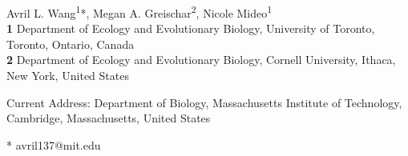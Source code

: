 \documentclass[10pt,letterpaper]{article}
\begin{document}
\vspace*{0.2in}

\begin{flushleft}
{\Large
\textbf{} 
}
\newline

Avril L. Wang\textsuperscript{1\textcurrency}*,
Megan A. Greischar\textsuperscript{2},
Nicole Mideo\textsuperscript{1}
\\
\bigskip
\textbf{1} Department of Ecology and Evolutionary Biology, University of Toronto, Toronto, Ontario, Canada
\\
\textbf{2} Department of Ecology and Evolutionary Biology, Cornell University, Ithaca, New York, United States
\\
\bigskip

\textcurrency Current Address: Department of Biology, Massachusetts Institute of Technology, Cambridge, Massachusetts, United States

* avril137@mit.edu

\end{flushleft}
\end{document}
